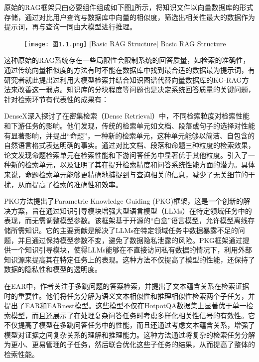 原始的RAG框架只由必要组件组成如下图\ref{基础RAG结构}所示，将知识文件以向量数据库的形式存储，通过对比用户查询与数据库中向量的相似度，筛选出相关性最大的数据作为提示词，再与查询一同由大模型进行推理。

\begin{figure}[!htbp]
  \centering
  \texttt{[image: 图1.1.png]}
  [Basic RAG Structure]{ Basic RAG Structure}
  \label{基础RAG结构}
\end{figure}

这种原始的RAG系统存在一些局限性会限制系统的回答质量，如检索的准确性，通过传统向量相似度的方法有时不能在数据库中找到最合适的数据最为提示词，有研究者就此提出过利用大模型检索并结合知识图谱代替向量数据库的KG-RAG\cite{wang2024knowledge}方法来改善这一弱点。知识库的分块程度等问题也是决定系统回答质量的关键问题，针对检索环节有代表性的成果有：

DenseX\cite{chen2024dense}深入探讨了在密集检索（Dense Retrieval）中，不同检索粒度对检索性能和下游任务的影响。他们发现，传统的检索单元如文档、段落或句子的选择对性能有显著影响，并提出“命题”，一种新的检索单元，这种单元能够以简洁、自包含的自然语言格式表达明确的事实。通过对比文档、段落和命题三种粒度的检索效果，论文发现命题检索单元在检索性能和下游问答任务中显著优于其他粒度。引入了一种新的检索单元，以及证明了其在提升检索精度和问答系统性能方面的潜力。具体来说，命题检索单元能够更精确地捕捉到与查询相关的信息，减少了无关细节的干扰，从而提高了检索的准确性和效率。

PKG\cite{luo2023augmented}方法提出了Parametric Knowledge Guiding (PKG)框架，这是一个创新的解决方案，旨在通过知识引导模块增强大型语言模型（LLMs）在特定领域任务中的表现，而无需调整模型参数。该框架基于开源的“白盒”语言模型，允许模型离线存储所需知识。它的主要贡献是解决了LLMs在特定领域任务中数据暴露不足的问题，并且通过保持模型参数不变，避免了数据隐私泄露的风险。PKG框架通过提供一个知识引导模块，使得LLMs能够在不直接访问私有数据的情况下，利用外部知识源来提高其在特定任务上的表现。这种方法不仅提高了模型的性能，还保持了数据的隐私性和模型的透明度。

在EAR\cite{luo2023divide}中，作者关注于多跳问题的答案检索，并提出了文本蕴含关系在检索证据时的重要性。他们将任务分解为语义文本相似性和推理相似性检索两个子任务，并提出了EAR和EARnest模型。这些模型不仅在HotpotQA数据集上显著优于单一检索模型，而且还展示了在处理复杂问答任务时考虑多样化相关性信号的有效性。它不仅提高了模型在多跳问答任务中的性能，而且还通过考虑文本蕴含关系，增强了模型对证据之间复杂关系的理解和推理能力。这种方法通过将复杂的检索任务分解为更小、更易管理的子任务，然后联合优化这些子任务的结果，从而提高了整体的检索性能。

